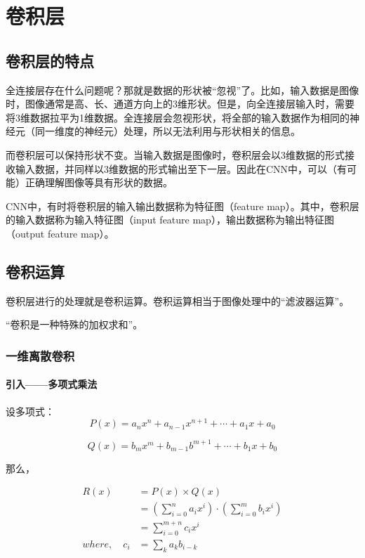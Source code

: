 \chapter{卷积层}

\section{卷积层的特点}
	
	全连接层存在什么问题呢？那就是数据的形状被“忽视”了。比如，输入数据是图像时，图像通常是高、长、通道方向上的3维形状。但是，向全连接层输入时，需要将3维数据拉平为1维数据。全连接层会忽视形状，将全部的输入数据作为相同的神经元（同一维度的神经元）处理，所以无法利用与形状相关的信息。
	
	而卷积层可以保持形状不变。当输入数据是图像时，卷积层会以3维数据的形式接收输入数据，并同样以3维数据的形式输出至下一层。因此在CNN中，可以（有可能）正确理解图像等具有形状的数据。
	
	CNN中，有时将卷积层的输入输出数据称为特征图（feature map）。其中，卷积层的输入数据称为输入特征图（input feature map），输出数据称为输出特征图（output feature map）\cite{RN1}。

\section{卷积运算}
	
	卷积层进行的处理就是卷积运算。卷积运算相当于图像处理中的“滤波器运算”。
	
	“卷积是一种特殊的加权求和”。
	\subsection{一维离散卷积}
		\subsubsection{引入——多项式乘法}
		
		设多项式：
		\begin{equation}
			\label{eq:1}
			P\left(x\right) = a_n x^n + a_{n-1} x^{n+1} + \cdots + a_1 x + a_0
		\end{equation}
	
		\begin{equation}
			\label{eq:2}
			Q\left(x\right) = b_m x^m + b_{m-1} b^{m+1} + \cdots + b_1 x + b_0
		\end{equation}
	
		那么，
		
		\begin{equation}
			\begin{aligned}
			R\left(x\right) &= P\left(x\right) \times Q\left(x\right) \\
			& = \left( \sum_{i=0}^{n} a_i x^i\right) \cdot \left( \sum_{i=0}^{m} b_i x^i\right) \\
			& = \sum_{i=0}^{m+n} c_i x^i \\
			where, \quad c_i & = \sum_k a_k b_{i-k}
			\end{aligned}
		\end{equation}
		
